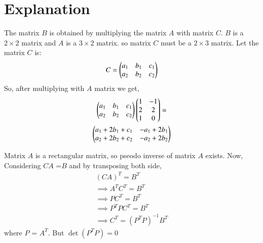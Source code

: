 \documentclass[journal,12pt,twocolumn]{IEEEtran}
\begin{document}
\section{Explanation}
The matrix $B$ is obtained by multiplying the matrix $A$ with matrix $C$. $B$ is a $2 \times 2$ matrix and $A$ is a $3 \times 2$ matrix. so matrix $C$ must be a $2 \times 3$ matrix.
Let the matrix $C$ is:
\begin{align}
C = \begin{pmatrix}a_1 & b_1 & c_1\\a_2 & b_2 & c_2\end{pmatrix}
\end{align}
So, after multiplying with $A$ matrix we get,
\begin{multline}
\begin{pmatrix}a_1 & b_1 & c_1\\a_2 & b_2 & c_2\end{pmatrix}\begin{pmatrix}1 & -1\\2 & 2\\1 & 0\end{pmatrix} =\\ \begin{pmatrix}a_1+2b_1+c_1 & -a_1+2b_1\\a_2+2b_2+c_2 & -a_2+2b_2\end{pmatrix}  
\end{multline}

Matrix $A$ is a rectangular matrix, so pseodo inverse of matrix $A$ exists.
Now, Considering $CA$ =$B$ and by transposing both side,
\begin{align}
(CA)^T = B^T\\
\implies A^T C^T = B^T\\
\implies P C^T = B^T\\
\implies P^T P C^T = B^T\\
\implies C^T = (P^T P)^{-1} B^T
\end{align}
 where $P$ = $A^T$.
But $\det(P^T P) = 0$
\end{document}
